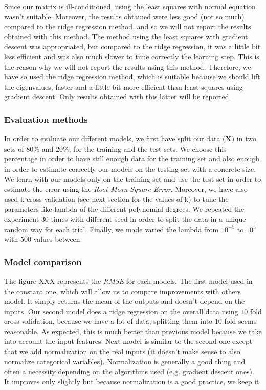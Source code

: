 \documentclass{article} %
\begin{document}
Since our matrix is ill-conditioned, using the least squares with normal equation wasn't suitable. Moreover, the results obtained were less good (not so much) compared to the ridge regression method, and so we will not report the results obtained with this method. The method using the least squares with gradient descent was appropriated, but compared to the ridge regression, it was a little bit less efficient and was also much slower to tune correctly the learning step. This is the reason why we will not report the results using this method. Therefore, we have so used the ridge regression method, which is suitable because we should lift the eigenvalues, faster and a little bit more efficient than least squares using gradient descent. Only results obtained with this latter will be reported.

\subsubsection{Evaluation methods}

In order to evaluate our different models, we first have split our data ($\mathbf{X}$) in two sets of $80\%$ and $20\%$, for the training and the test sets. We choose this percentage in order to have still enough data for the training set and also enough in order to estimate correctly our models on the testing set with a concrete size. We learn with our models only on the training set and use the test set in order to estimate the error using the \textit{Root Mean Square Error}. Moreover, we have also used k-cross validation (see next section for the values of k) to tune the parameters like lambda of the different polynomial degrees. We repeated the experiment $30$ times with different seed in order to split the data in a unique random way for each trial. Finally, we made varied the lambda from $10^{-5}$ to $10^{5}$ with $500$ values between.

\subsubsection{Model comparison}

The figure XXX represents the \textit{RMSE} for each models. The first model used in the constant one, which will allow us to compare improvements with others model. It simply returns the mean of the outputs and doesn't depend on the inputs. Our second model does a ridge regression on the overall data using $10$ fold cross validation, because we have a lot of data, splitting them into $10$ fold seems reasonable. As expected, this is much better than previous model because we take into account the input features. Next model is similar to the second one except that we add normalization on the real inputs (it doesn't make sense to also normalize categorical variables). Normalization is generally a good thing and often a necessity depending on the algorithms used (e.g. gradient descent ones). It improves only slightly but because normalization is a good practice, we keep it.
\end{document}
